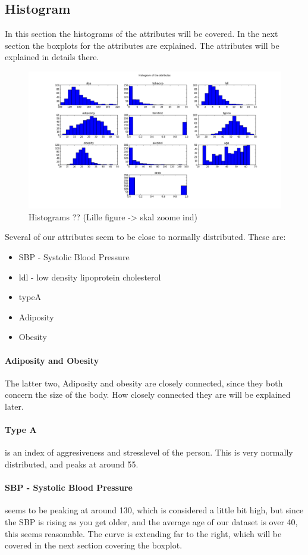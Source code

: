 \subsection{Histogram}
In this section the histograms of the attributes will be covered. In the next section the boxplots for the attributes are explained. The attributes will be explained in details there.
\begin{figure}[H]
\centering
\includegraphics[width=12cm, keepaspectratio=true]{pictures/histogram.png}
\caption{\footnotesize Histograms ?? (Lille figure -> skal zoome ind)}
\label{histogram}
\end{figure}
Several of our attributes seem to be close to normally distributed. These are:
\begin{itemize}
\item SBP - Systolic Blood Pressure
\item ldl - low density lipoprotein cholesterol
\item typeA
\item Adiposity
\item Obesity
\end{itemize}
\paragraph{Adiposity and Obesity}
The latter two, Adiposity and obesity are closely connected, since they both concern the size of the body. How closely connected they are will be explained later.

\paragraph{Type A} is an index of aggresiveness and stresslevel of the person. This is very normally distributed, and peaks at around 55.

\paragraph{SBP - Systolic Blood Pressure} 	seems to be peaking at around 130, which is considered a little bit high, but since the SBP is rising as you get older, and the average age of our dataset is over 40, this seems reasonable. The curve is extending far to the right, which will be covered in the next section covering the boxplot.

